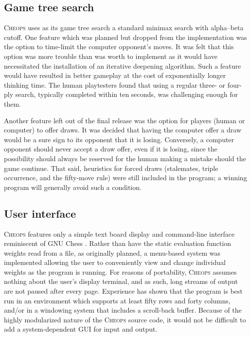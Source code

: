\documentclass[a4paper]{article}
\begin{document}
\subsection{Game tree search}

\textsc{Cheops} uses as its game tree search a standard minimax search
with alpha--beta cutoff. One feature which was planned but dropped
from the implementation was the option to time-limit the computer
opponent's moves. It was felt that this option was more trouble than
was worth to implement as it would have necessitated the installation
of an iterative deepening algorithm. Such a feature would have
resulted in better gameplay at the cost of exponentially longer
thinking time. The human playtesters found that using a regular three-
or four-ply search, typically completed within ten seconds, was
challenging enough for them.

Another feature left out of the final release was the option for
players (human or computer) to offer draws. It was decided that having
the computer offer a draw would be a sure sign to its opponent that it
is losing. Conversely, a computer opponent should never accept a draw
offer, even if it is losing, since the possibility should always be
reserved for the human making a mistake should the game continue. That
said, heuristics for forced draws (stalemates, triple occurrence, and
the fifty-move rule) were still included in the program; a winning
program will generally avoid such a condition.

\subsection{User interface}

\textsc{Cheops} features only a simple text board display and
command-line interface reminiscent of GNU Chess \cite{gnuchess}.
Rather than have the static evaluation function weights read from a
file, as originally planned, a menu-based system was implemented
allowing the user to conveniently view and change individual weights
as the program is running. For reasons of portability, \textsc{Cheops}
assumes nothing about the user's display terminal, and as such, long
streams of output are not paused after every page. Experience has
shown that the program is best run in an environment which supports at
least fifty rows and forty columns, and\slash or in a windowing system
that includes a scroll-back buffer.  Because of the highly modularized
nature of the \textsc{Cheops} source code, it would not be difficult
to add a system-dependent GUI for input and output.
\end{document}
